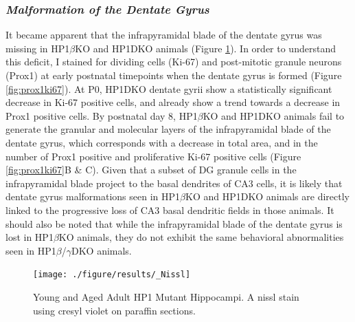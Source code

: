 \documentclass[onehalf,12pt]{beavtex}
\begin{document}
  \subsubsection*{\texorpdfstring{\emph{Malformation of the Dentate
  Gyrus}}{Malformation of the Dentate Gyrus}}\label{malformation-of-the-dentate-gyrus}
  
  It became apparent that the infrapyramidal blade of the dentate gyrus
  was missing in HP1\(\beta\)KO and HP1DKO animals (Figure
  \ref{fig:nissl}). In order to understand this deficit, I stained for
  dividing cells (Ki-67) and post-mitotic granule neurons (Prox1) at early
  postnatal timepoints when the dentate gyrus is formed (Figure
  \ref{fig:prox1ki67}). At P0, HP1DKO dentate gyrii show a statistically
  significant decrease in Ki-67 positive cells, and already show a trend
  towards a decrease in Prox1 positive cells. By postnatal day 8,
  HP1\(\beta\)KO and HP1DKO animals fail to generate the granular and
  molecular layers of the infrapyramidal blade of the dentate gyrus, which
  corresponds with a decrease in total area, and in the number of Prox1
  positive and proliferative Ki-67 positive cells (Figure
  \ref{fig:prox1ki67}B \& C). Given that a subset of DG granule cells in
  the infrapyramidal blade project to the basal dendrites of CA3 cells, it
  is likely that dentate gyrus malformations seen in HP1\(\beta\)KO and
  HP1DKO animals are directly linked to the progressive loss of CA3 basal
  dendritic fields in those animals. It should also be noted that while
  the infrapyramidal blade of the dentate gyrus is lost in HP1\(\beta\)KO
  animals, they do not exhibit the same behavioral abnormalities seen in
  HP1\(\beta\)/\(\gamma\)DKO animals. \FloatBarrier
  
  \begin{figure}
  
  {\centering \texttt{[image: ./figure/results/\_Nissl]} 
  
  }
  
  \caption[Young and Aged Adult HP1 Mutant Hippocampi]{Young and Aged Adult HP1 Mutant Hippocampi. A nissl stain using cresyl violet on paraffin sections.}\label{fig:nissl}
  \end{figure}
  
\end{document}
